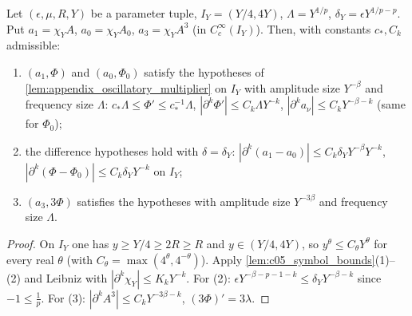 \begin{lemma}
  \label{lem:c05_multiplier_hypotheses}
  Let $(\epsilon,\mu,R,Y)$ be a parameter tuple, $I_Y=(Y/4,4Y)$, $\Lambda=Y^{1/p}$, $\delta_Y=\epsilon Y^{1/p-p}$. Put
  $a_1=\chi_YA$, $a_0=\chi_YA_0$, $a_3=\chi_YA^3$ (in $C_c^\infty(I_Y)$). Then, with constants $c_*,C_k$ admissible:
  \begin{enumerate}
    \item $(a_1,\Phi)$ and $(a_0,\Phi_0)$ satisfy the hypotheses of \cref{lem:appendix_oscillatory_multiplier} on $I_Y$ with
      amplitude size $Y^{-\beta}$ and frequency size $\Lambda$: $c_*\Lambda\le\Phi'\le c_*^{-1}\Lambda$,
      $|\partial^k\Phi'|\le C_k\Lambda Y^{-k}$, $|\partial^ka_\nu|\le C_kY^{-\beta-k}$ (same for $\Phi_0$);
    \item the difference hypotheses hold with $\delta=\delta_Y$: $|\partial^k(a_1-a_0)|\le C_k\delta_YY^{-\beta}Y^{-k}$,
      $|\partial^k(\Phi-\Phi_0)|\le C_k\delta_YY^{-k}$ on $I_Y$;
    \item $(a_3,3\Phi)$ satisfies the hypotheses with amplitude size $Y^{-3\beta}$ and frequency size $\Lambda$.
  \end{enumerate}
\end{lemma}
\begin{proof}
  On $I_Y$ one has $y\ge Y/4\ge2R\ge R$ and $y\in(Y/4,4Y)$, so $y^{\theta}\le C_\theta Y^\theta$ for every real $\theta$
  (with $C_\theta=\max(4^\theta,4^{-\theta})$). Apply \cref{lem:c05_symbol_bounds}(1)--(2) and Leibniz with
  $|\partial^k\chi_Y|\le K_kY^{-k}$. For (2): $\epsilon Y^{-\beta-p-1-k}\le\delta_YY^{-\beta-k}$ since $-1\le\frac1p$.
  For (3): $|\partial^kA^3|\le C_kY^{-3\beta-k}$, $(3\Phi)'=3\lambda$.
\end{proof}

